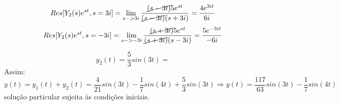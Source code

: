 \begin{equation*}
    Res[Y_2(s)e^{st}, s=3i] = \lim_{s->3i} \frac{\cancel{(s-3i)}5e^{st}}{\cancel{(s-3i)}(s+3i)} = \frac{4e^{3it}}{6i}
\end{equation*}
\begin{equation*}
    Res[Y_2(s)e^{st}, s=-3i] = \lim_{s->-3i} \frac{\cancel{(s+3i)}5e^{st}}{\cancel{(s+3i)}(s-3i)} = \frac{5e^{-3it}}{-6i}
\end{equation*}

\begin{equation*}
    y_2(t) = \frac{5}{3}sin(3t) = 
\end{equation*}
Assim:
\begin{equation*}
    y(t) = y_1(t) + y_2(t) = \frac{4}{21}sin(3t) - \frac{1}{7}sin(4t) + \frac{5}{3}sin(3t) \Rightarrow \boxed{y(t) =  \frac{117}{63}sin(3t) - \frac{1}{7}sin(4t)}
\end{equation*}
solução particular sujeita às condições iniciais.